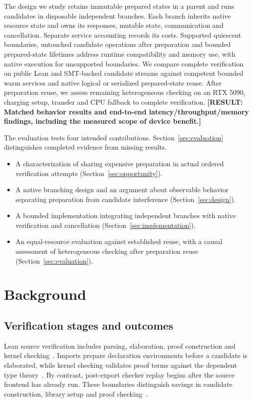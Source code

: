 \documentclass[10pt,twocolumn]{article}
\newcommand{\missing}[1]{\textbf{[RESULT: #1]}}
\begin{document}
The design we study retains immutable prepared states in a parent and runs candidates in disposable independent branches. Each branch inherits native resource state and owns its responses, mutable state, communication and cancellation. Separate service accounting records its costs. Supported quiescent boundaries, untouched candidate operations after preparation and bounded prepared-state lifetimes address runtime compatibility and memory use, with native execution for unsupported boundaries. We compare complete verification on public Lean and SMT-backed candidate streams against competent bounded warm services and native logical or serialized prepared-state reuse. After preparation reuse, we assess remaining heterogeneous checking on an RTX 5090, charging setup, transfer and CPU fallback to complete verification. \missing{Matched behavior results and end-to-end latency/throughput/memory findings, including the measured scope of device benefit.}

The evaluation tests four intended contributions. Section~\ref{sec:evaluation} distinguishes completed evidence from missing results.
\begin{itemize}
\item A characterization of sharing expensive preparation in actual ordered verification attempts (Section~\ref{sec:opportunity}).
\item A native branching design and an argument about observable behavior separating preparation from candidate interference (Section~\ref{sec:design}).
\item A bounded implementation integrating independent branches with native verification and cancellation (Section~\ref{sec:implementation}).
\item An equal-resource evaluation against established reuse, with a causal assessment of heterogeneous checking after preparation reuse (Section~\ref{sec:evaluation}).
\end{itemize}

\section{Background}\label{sec:background}
\subsection{Verification stages and outcomes}
Lean source verification includes parsing, elaboration, proof construction and kernel checking~\cite{lean4}. Imports prepare declaration environments before a candidate is elaborated, while kernel checking validates proof terms against the dependent type theory~\cite{lean4}. By contrast, post-export checker replay begins after the source frontend has already run. These boundaries distinguish savings in candidate construction, library setup and proof checking~\cite{leanArena,repl}.
\end{document}
